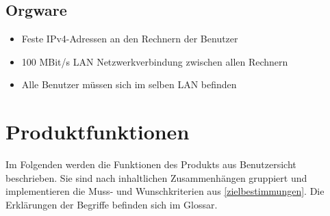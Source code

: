 \documentclass{scrartcl}
\begin{document}
\subsection{Orgware}
\begin{itemize}
\item Feste IPv4-Adressen an den Rechnern der Benutzer
\item 100 MBit/s LAN Netzwerkverbindung zwischen allen Rechnern
\item Alle Benutzer müssen sich im selben LAN befinden
\end{itemize}

\section{Produktfunktionen}

Im Folgenden werden die Funktionen des Produkts aus Benutzersicht beschrieben. Sie sind nach inhaltlichen Zusammenhängen gruppiert und implementieren die Muss- und Wunschkriterien aus \ref{zielbestimmungen}. Die Erklärungen der Begriffe befinden sich im Glossar.
\end{document}
